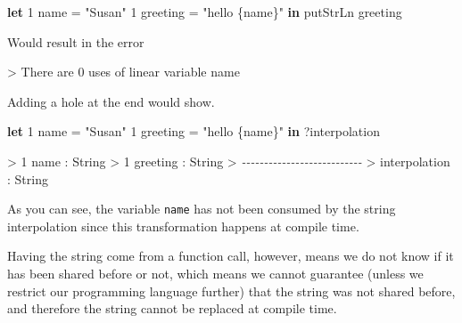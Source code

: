 \documentclass[
]{article}
\newenvironment{Shaded}{}{}
\newcommand{\CommentTok}[1]{\textcolor[rgb]{0.38,0.63,0.69}{\textit{#1}}}
\newcommand{\DataTypeTok}[1]{\textcolor[rgb]{0.56,0.13,0.00}{#1}}
\newcommand{\DecValTok}[1]{\textcolor[rgb]{0.25,0.63,0.44}{#1}}
\newcommand{\FunctionTok}[1]{\textcolor[rgb]{0.02,0.16,0.49}{#1}}
\newcommand{\KeywordTok}[1]{\textcolor[rgb]{0.00,0.44,0.13}{\textbf{#1}}}
\newcommand{\NormalTok}[1]{#1}
\newcommand{\OperatorTok}[1]{\textcolor[rgb]{0.40,0.40,0.40}{#1}}
\newcommand{\OtherTok}[1]{\textcolor[rgb]{0.00,0.44,0.13}{#1}}
\newcommand{\StringTok}[1]{\textcolor[rgb]{0.25,0.44,0.63}{#1}}
\begin{document}
\begin{Shaded}
\begin{Highlighting}[]
\KeywordTok{let} \DecValTok{1}\NormalTok{ name }\OtherTok{=} \StringTok{"Susan"}
    \DecValTok{1}\NormalTok{ greeting }\OtherTok{=} \StringTok{"hello \{name\}"} \KeywordTok{in}
    \FunctionTok{putStrLn}\NormalTok{ greeting}
\end{Highlighting}
\end{Shaded}

Would result in the error

\begin{Shaded}
\begin{Highlighting}[]
\OperatorTok{\textgreater{}}\NormalTok{ There are }\DecValTok{0}\NormalTok{ uses of linear variable name}
\end{Highlighting}
\end{Shaded}

Adding a hole at the end would show.

\begin{Shaded}
\begin{Highlighting}[]
\KeywordTok{let} \DecValTok{1}\NormalTok{ name }\OtherTok{=} \StringTok{"Susan"}
    \DecValTok{1}\NormalTok{ greeting }\OtherTok{=} \StringTok{"hello \{name\}"} \KeywordTok{in}
    \OperatorTok{?}\NormalTok{interpolation}
\end{Highlighting}
\end{Shaded}

\begin{Shaded}
\begin{Highlighting}[]
\OperatorTok{\textgreater{}} \DecValTok{1}\NormalTok{ name }\OperatorTok{:} \DataTypeTok{String}
\OperatorTok{\textgreater{}} \DecValTok{1}\NormalTok{ greeting }\OperatorTok{:} \DataTypeTok{String}
\OperatorTok{\textgreater{}} \CommentTok{{-}{-}{-}{-}{-}{-}{-}{-}{-}{-}{-}{-}{-}{-}{-}{-}{-}{-}{-}{-}{-}{-}{-}{-}{-}{-}{-}}
\OperatorTok{\textgreater{}}\NormalTok{ interpolation }\OperatorTok{:} \DataTypeTok{String}
\end{Highlighting}
\end{Shaded}

As you can see, the variable \texttt{name} has not been consumed by the
string interpolation since this transformation happens at compile time.

Having the string come from a function call, however, means we do not
know if it has been shared before or not, which means we cannot
guarantee (unless we restrict our programming language further) that the
string was not shared before, and therefore the string cannot be
replaced at compile time.
\end{document}
